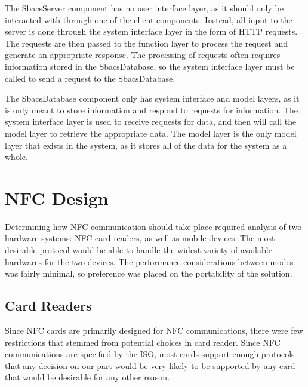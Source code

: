 \documentclass[12pt]{report}
\let\Oldsection\section
\renewcommand{\section}{\FloatBarrier\Oldsection}
\let\Oldsubsection\subsection
\renewcommand{\subsection}{\FloatBarrier\Oldsubsection}
\begin{document}
The SbacsServer component has no user interface layer, as it should only be interacted with through one of the client
components. Instead, all input to the server is done through the system interface layer in the form of HTTP requests.
The requests are then passed to the function layer to process the request and generate an appropriate response. The
processing of requests often requires information stored in the SbacsDatabase, so the system interface layer must be
called to send a request to the SbacsDatabase.

The SbacsDatabase component only has system interface and model layers, as it is only meant to store information and
respond to requests for information. The system interface layer is used to receive requests for data, and then will
call the model layer to retrieve the appropriate data. The model layer is the only model layer that exists in the
system, as it stores all of the data for the system as a whole.



\section{NFC Design} \label{nfc-design}

Determining how NFC communication should take place required analysis of two hardware systems: NFC card readers, as well
as mobile devices. The most desirable protocol would be able to handle the widest variety of available hardwares for
the two devices. The performance considerations between modes was fairly minimal, so preference was placed on the
portability of the solution.


\subsection{Card Readers} \label{card-readers}

Since NFC cards are primarily designed for NFC communications, there were few restrictions that stemmed from potential
choices in card reader. Since NFC communications are specified by the ISO, most cards support enough protocols that any
decision on our part would be very likely to be supported by any card that would be desirable for any other reason.

\end{document}
